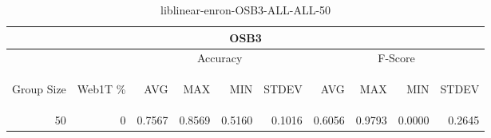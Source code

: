 \begin{center}
\begin{table}[htbp] 
 \begin{center}
\begin{tabular}{ | r | r | r | r | r | r | r | r | r | r |}
\hline
\multicolumn{10}{|c|}{OSB3}\\
\hline
 & & \multicolumn{4}{|c|}{Accuracy} & \multicolumn{4}{|c|}{F-Score}\\ \cline{3-10}
\begin{sideways}Group Size\end{sideways} & \begin{sideways}Web1T \%\end{sideways} & \begin{sideways}AVG\end{sideways} & \begin{sideways}MAX\end{sideways} & \begin{sideways}MIN\end{sideways} & \begin{sideways}STDEV\end{sideways} & \begin{sideways}AVG\end{sideways} & \begin{sideways}MAX\end{sideways} & \begin{sideways}MIN\end{sideways} & \begin{sideways}STDEV\end{sideways}\\
\hline
\multirow{0}{*}{50}
 & 0 & 0.7567 & 0.8569 & 0.5160 & 0.1016 & 0.6056 & 0.9793 & 0.0000 & 0.2645\\ \cline{2-10}
\hline
\end{tabular}
\caption{liblinear-enron-OSB3-ALL-ALL-50}
\label{table:liblinear-enron-OSB3-ALL-ALL-50}
\end{center}
 \end{table}
\end{center}

